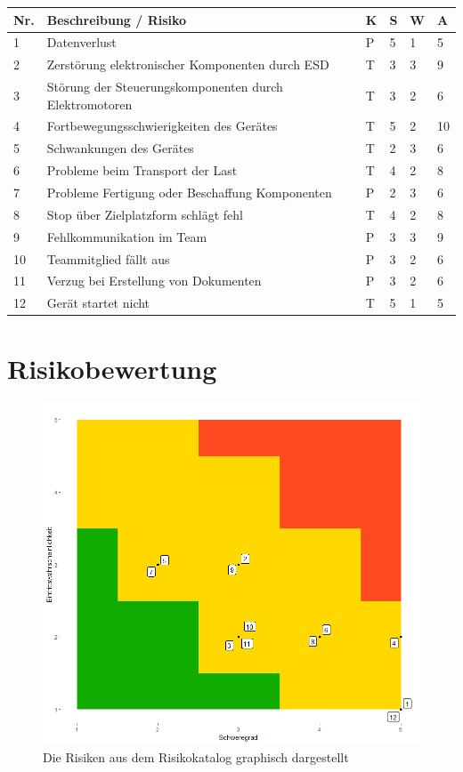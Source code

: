 \documentclass[a4paper]{report}
\begin{document}
\vspace{1em}
\noindent
\begin{tabular}{|p{}|p{}|p{}|p{}|p{}||p{}|}
	\hline
	\textbf{Nr.} & \textbf{Beschreibung / Risiko} & \textbf{K} & \textbf{S} & \textbf{W} & \textbf{A} \\
	\hline
	1 & Datenverlust & P & 5 & 1 & 5\\
	\hline
	2 & Zerstörung elektronischer Komponenten durch ESD & T & 3 & 3 & 9 \\
	\hline
	3 & Störung der Steuerungskomponenten durch Elektromotoren & T & 3 & 2 & 6 \\
	\hline
	4 & Fortbewegungsschwierigkeiten des Gerätes & T & 5 & 2 & 10 \\
	\hline
	5 & Schwankungen des Gerätes & T & 2 & 3 & 6 \\
	\hline
	6 & Probleme beim Transport der Last & T & 4 & 2 & 8 \\
	\hline
	7 & Probleme Fertigung oder Beschaffung Komponenten & P & 2 & 3 & 6 \\
	\hline
	8 & Stop über Zielplatzform schlägt fehl & T & 4 & 2 & 8 \\
	\hline
	9 & Fehlkommunikation im Team & P & 3 & 3 & 9 \\
	\hline
	10 & Teammitglied fällt aus & P & 3 & 2 & 6 \\
	\hline
	11 & Verzug bei Erstellung von Dokumenten & P & 3 & 2 & 6 \\
	\hline
	12 & Gerät startet nicht & T & 5 & 1 & 5 \\
	\hline
\end{tabular}

\section{Risikobewertung}
\label{sec:RisikoBewertung}
\begin{figure}[h!]
	\centering
	\includegraphics[width=.6\textwidth,keepaspectratio]{Risikomatrix}
	\caption{Die Risiken aus dem Risikokatalog graphisch dargestellt}
	\label{fig:Risikomatrix}
\end{figure}
\end{document}
